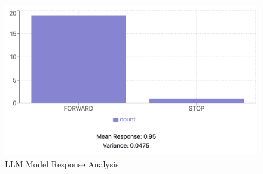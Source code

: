\documentclass[conference]{IEEEtran}
\begin{document}
 
 \begin{figure}[h]
     \centering
     \includegraphics[width=\linewidth]{Fig/chart.png}
     \caption{LLM Model Response Analysis}
     \label{fig:enter-label}
 \end{figure}
 
\end{document}
